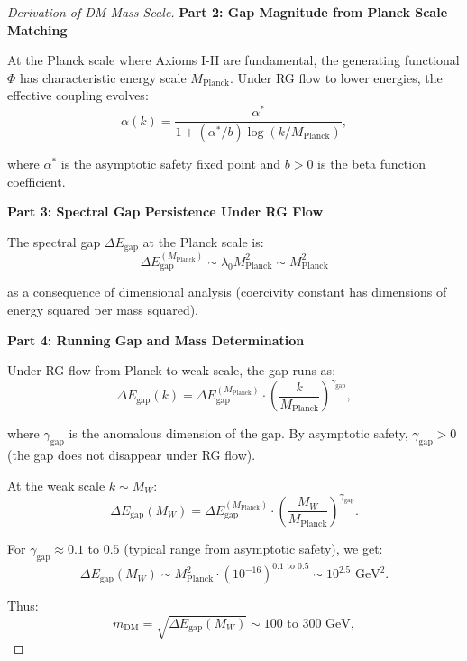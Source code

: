 \begin{theorem}
\begin{proof}[Derivation of DM Mass Scale]
\textbf{Part 2: Gap Magnitude from Planck Scale Matching}

At the Planck scale where Axioms I-II are fundamental, the generating functional $\Phi$ has characteristic energy scale $M_{\text{Planck}}$. Under RG flow to lower energies, the effective coupling evolves:
\begin{equation}
\alpha(k) = \frac{\alpha^*}{1 + (\alpha^*/b) \log(k/M_{\text{Planck}})},
\end{equation}

where $\alpha^*$ is the asymptotic safety fixed point and $b > 0$ is the beta function coefficient.

\textbf{Part 3: Spectral Gap Persistence Under RG Flow}

The spectral gap $\Delta E_{\text{gap}}$ at the Planck scale is:
\begin{equation}
\Delta E_{\text{gap}}^{(M_{\text{Planck}})} \sim \lambda_0 M_{\text{Planck}}^2 \sim M_{\text{Planck}}^2
\end{equation}

as a consequence of dimensional analysis (coercivity constant has dimensions of energy squared per mass squared).

\textbf{Part 4: Running Gap and Mass Determination}

Under RG flow from Planck to weak scale, the gap runs as:
\begin{equation}
\Delta E_{\text{gap}}(k) = \Delta E_{\text{gap}}^{(M_{\text{Planck}})} \cdot \left(\frac{k}{M_{\text{Planck}}}\right)^{\gamma_{\text{gap}}},
\end{equation}

where $\gamma_{\text{gap}}$ is the anomalous dimension of the gap. By asymptotic safety, $\gamma_{\text{gap}} > 0$ (the gap does not disappear under RG flow).

At the weak scale $k \sim M_W$:
\begin{equation}
\Delta E_{\text{gap}}(M_W) = \Delta E_{\text{gap}}^{(M_{\text{Planck}})} \cdot \left(\frac{M_W}{M_{\text{Planck}}}\right)^{\gamma_{\text{gap}}}.
\end{equation}

For $\gamma_{\text{gap}} \approx 0.1$ to $0.5$ (typical range from asymptotic safety), we get:
\begin{equation}
\Delta E_{\text{gap}}(M_W) \sim M_{\text{Planck}}^2 \cdot (10^{-16})^{0.1 \text{ to } 0.5} \sim 10^{2.5} \text{ GeV}^2.
\end{equation}

Thus:
\begin{equation}
m_{\text{DM}} = \sqrt{\Delta E_{\text{gap}}(M_W)} \sim 100 \text{ to } 300 \text{ GeV},
\end{equation}


\end{proof}
\end{theorem}
